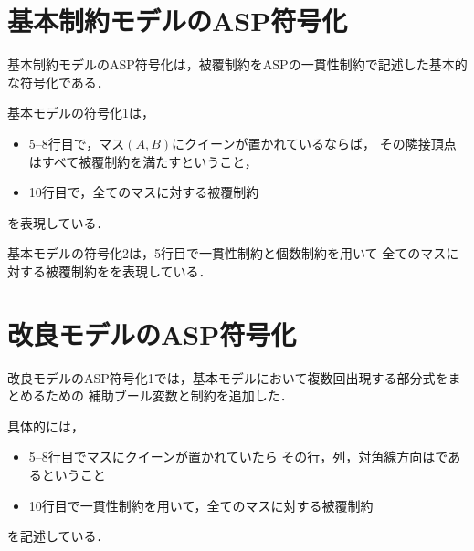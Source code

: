 \newpage

\section{基本制約モデルのASP符号化}
基本制約モデルのASP符号化は，被覆制約をASPの一貫性制約で記述した基本的な符号化である．



基本モデルの符号化1は，
\begin{itemize}
 \item 5--8行目で，マス$(A,B)$にクイーンが置かれているならば，
  その隣接頂点はすべて被覆制約を満たすということ，
 \item 10行目で，全てのマスに対する被覆制約
\end{itemize}
を表現している．




基本モデルの符号化2は，5行目で一貫性制約と個数制約を用いて
全てのマスに対する被覆制約をを表現している．
\newpage
\section{改良モデルのASP符号化}


改良モデルのASP符号化1では，基本モデルにおいて複数回出現する部分式をまとめるための
補助ブール変数と制約を追加した．

具体的には，
\begin{itemize}
  \item 5--8行目でマスにクイーンが置かれていたら
    その行，列，対角線方向はであるということ
  \item 10行目で一貫性制約を用いて，全てのマスに対する被覆制約
\end{itemize}
を記述している．




